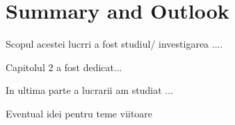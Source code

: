 \chapter{Summary and Outlook
 }
\label{so}

\indent

Scopul acestei lucr\ab ri  a fost studiul/ investigarea ....

Capitolul 2 a fost dedicat...

In ultima parte a lucrarii am studiat ...

Eventual idei pentru teme viitoare
 





















